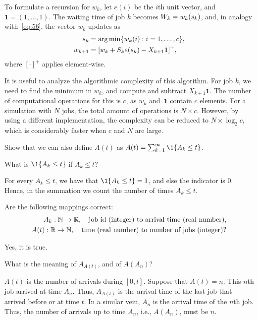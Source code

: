 To formulate a recursion for $w_{k}$, let $e(i)$ be the $i$th unit vector, and $\mathbf{1} = (1,\ldots, 1)$.
The waiting time of job $k$ becomes $W_k = w_{k}(s_k)$, and, in analogy with~\cref{eq:56}, the vector $w_k$ updates as
\begin{align*}
  s_k &= \operatorname*{arg\,min}\{w_{k}(i) : i=1,\ldots, c\},\\
  w_{k+1} &= [w_k + S_k e(s_k) - X_{k+1}\mathbf{1}]^+,
\end{align*}
where $[\cdot]^+$ applies element-wise.

It is useful to analyze the algorithmic complexity of this algorithm.
For job $k$, we need to find the minimum in $w_k$, and compute and subtract $X_{k+1}\mathbf{1}$.
The number of computational operations for this is $c$, as $w_k$ and~$\mathbf{1}$ contain $c$ elements.
For a simulation with $N$ jobs, the total amount of operations is $N \times c$.
However, by using a different implementation, the complexity can be reduced to $N\times \log_2{c}$, which is considerably faster when $c$ and $N$ are large.



\begin{exercise}\label{ex:20}
Show that we can also define $A(t)$ as $A(t) = \sum_{k=1}^\infty \1{A_k \leq t}$.
\begin{hint}
  What is $\1{A_k \leq t}$ if $A_k \leq t$?
\end{hint}
\begin{solution}
For every $A_k \leq t$, we have that $\1{A_k \leq t} = 1$, and else the indicator is $0$. Hence, in the summation we count the number of times $A_k \leq t$.
\end{solution}
\end{exercise}

\begin{exercise}\label{ex:60}
Are the following mappings correct:
\begin{align*}
 A_k : \mathbb{N} \to \mathbb{R}, \quad{\text{job id (integer) to arrival time (real number)}}, \\
 A(t) : \mathbb{R}\to \mathbb{N}, \quad{\text{time (real number) to number of jobs (integer)}}?
\end{align*}
\begin{solution}
  Yes, it is true.
\end{solution}
\end{exercise}

\begin{exercise}\label{ex:61}
 What is the meaning of $A_{A(t)}$, and of $A(A_n)$?
\begin{solution}
 $A(t)$ is the number of arrivals during $[0,t]$. Suppose that
 $A(t) = n$. This $n$th job arrived at time $A_n$. Thus, $A_{A(t)}$
 is the arrival time of the last job that arrived before or at time
 $t$. In a similar vein, $A_n$ is the arrival time of the $n$th
 job. Thus, the number of arrivals up to time $A_n$, i.e., $A(A_n)$,
 must be $n$.
\end{solution}
\end{exercise}

